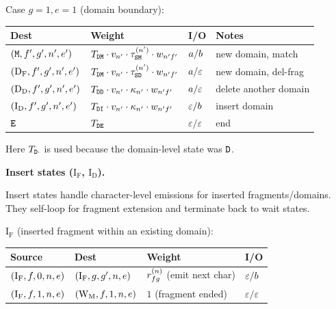 \noindent Case $g=1, e=1$ (domain boundary):
\begin{center}
\renewcommand{\arraystretch}{1.3}
\begin{tabular}{llll}
\hline
Dest & Weight & I/O & Notes \\
\hline
$({\tt M}, f', g', n', e')$ &
  $T_{{\tt D}{\tt M}} \cdot v_{n'} \cdot
   \tau^{(n')}_{{\tt S}{\tt M}} \cdot w_{n'f'}$ &
  $a / b$ &
  new domain, match \\
$(\mathrm{D_F}, f', g', n', e')$ &
  $T_{{\tt D}{\tt M}} \cdot v_{n'} \cdot
   \tau^{(n')}_{{\tt S}{\tt D}} \cdot w_{n'f'}$ &
  $a / \varepsilon$ &
  new domain, del-frag \\
$(\mathrm{D_D}, f', g', n', e')$ &
  $T_{{\tt D}{\tt D}} \cdot v_{n'} \cdot
   \kappa_{n'} \cdot w_{n'f'}$ &
  $a / \varepsilon$ &
  delete another domain \\
$(\mathrm{I_D}, f', g', n', e')$ &
  $T_{{\tt D}{\tt I}} \cdot v_{n'} \cdot
   \kappa_{n'} \cdot w_{n'f'}$ &
  $\varepsilon / b$ &
  insert domain \\
${\tt E}$ &
  $T_{{\tt D}{\tt E}}$ &
  $\varepsilon / \varepsilon$ &
  end \\
\hline
\end{tabular}
\end{center}

Here $T_{{\tt D}\cdot}$ is used because the domain-level state was ${\tt D}$.

\bigskip
\noindent\textbf{Insert states ($\mathrm{I_F}$, $\mathrm{I_D}$).}

Insert states handle character-level emissions for inserted fragments/domains.
They self-loop for fragment extension and terminate back to wait states.

\medskip
\noindent $\mathrm{I_F}$ (inserted fragment within an existing domain):
\begin{center}
\renewcommand{\arraystretch}{1.3}
\begin{tabular}{llll}
\hline
Source & Dest & Weight & I/O \\
\hline
$(\mathrm{I_F}, f, 0, n, e)$ &
  $(\mathrm{I_F}, g, g', n, e)$ &
  $r^{(n)}_{fg}$ (emit next char) &
  $\varepsilon / b$ \\
$(\mathrm{I_F}, f, 1, n, e)$ &
  $(\mathrm{W_M}, f, 1, n, e)$ &
  $1$ (fragment ended) &
  $\varepsilon / \varepsilon$ \\
\hline
\end{tabular}
\end{center}

